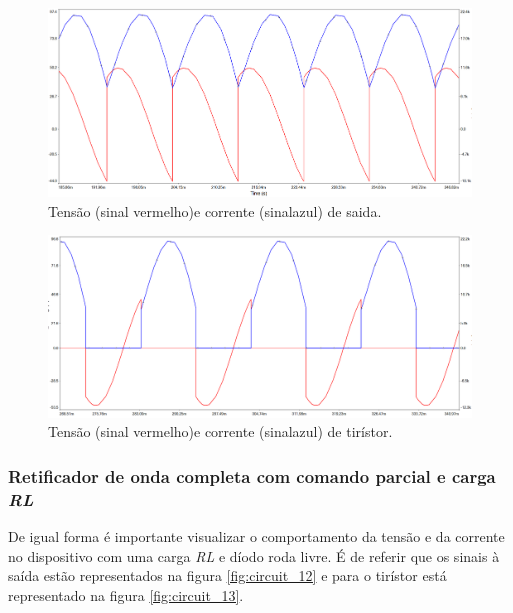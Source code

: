 \documentclass[a4paper,11pt]{article}
\numberwithin{equation}{section}
\begin{document}
\begin{figure}[h]
	\centering
	\includegraphics[keepaspectratio=true, scale=0.4]{img/circuito8}
	\caption{Tensão (sinal vermelho)e corrente (sinalazul) de saida.}
	\label{fig:circuit_10}
	\vspace{-0.8em}
\end{figure}

\begin{figure}[h]
	\centering
	\includegraphics[keepaspectratio=true, scale=0.4]{img/circuito9}
	\caption{Tensão (sinal vermelho)e corrente (sinalazul) de tirístor.}
	\label{fig:circuit_11}
	\vspace{-0.8em}
\end{figure}

\vspace{12mm}


\subsubsection{Retificador de onda completa com comando parcial e carga \textit{RL}}
De igual forma é importante visualizar o comportamento da tensão e da corrente no dispositivo com uma carga \textit{RL} e díodo roda livre. É de referir que os sinais à saída estão representados na figura \ref{fig:circuit_12} e para o tirístor está representado na figura \ref{fig:circuit_13}.
\end{document}
